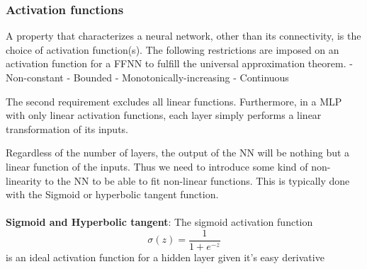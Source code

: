 \subsubsection{Activation functions}
%
A property that characterizes a neural network, other than its connectivity, is
the choice of activation function(s). 
The following restrictions are imposed on an activation function for a FFNN to
fulfill the universal approximation theorem.
- Non-constant
- Bounded
- Monotonically-increasing
- Continuous

The second requirement excludes all linear functions. Furthermore, in a MLP
with only linear activation functions, each layer simply performs a linear
transformation of its inputs.

Regardless of the number of layers, the output of the NN will be nothing but a
linear function of the inputs. Thus we need to introduce some kind of
non-linearity to the NN to be able to fit non-linear functions. This is
typically done with the Sigmoid or hyperbolic tangent function.
\\~\\
\textbf{Sigmoid and Hyperbolic tangent}:
The sigmoid activation function
\begin{equation*}
    \sigma(z) = \frac{1}{1+e^{-z}}
\end{equation*}
is an ideal activation function for a hidden layer given it's easy derivative

